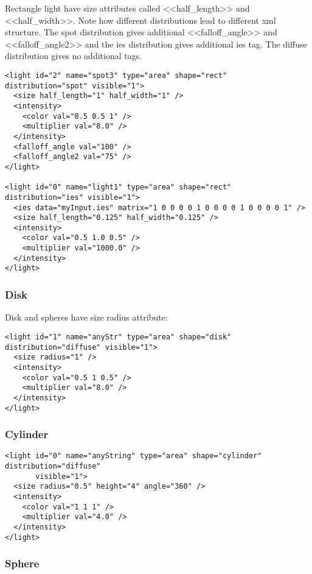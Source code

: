 \documentclass[a4paper,11pt]{report}
\begin{document}
Rectangle light have size attributes called <<half\_length>> and <<half\_width>>. Note how different distributions lead to different xml structure. The spot distribution gives additional <<falloff\_angle>> and <<falloff\_angle2>> and the ies distribution gives additional ies tag. The diffuse distribution gives no additional tags. 

\lstset{language=XML}
\begin{lstlisting}
<light id="2" name="spot3" type="area" shape="rect" distribution="spot" visible="1">
  <size half_length="1" half_width="1" />
  <intensity>
    <color val="0.5 0.5 1" />
    <multiplier val="8.0" />
  </intensity>
  <falloff_angle val="100" />
  <falloff_angle2 val="75" />
</light>

<light id="0" name="light1" type="area" shape="rect" distribution="ies" visible="1">
  <ies data="myInput.ies" matrix="1 0 0 0 0 1 0 0 0 0 1 0 0 0 0 1" />  
  <size half_length="0.125" half_width="0.125" />
  <intensity>
    <color val="0.5 1.0 0.5" />
    <multiplier val="1000.0" />
  </intensity>
</light>
\end{lstlisting}

\subsubsection{Disk}

Disk and spheres have size radius attribute:

\lstset{language=XML}
\begin{lstlisting}
<light id="1" name="anyStr" type="area" shape="disk" distribution="diffuse" visible="1">
  <size radius="1" />
  <intensity>
    <color val="0.5 1 0.5" />
    <multiplier val="8.0" />
  </intensity>
</light>
\end{lstlisting}

\subsubsection{Cylinder}

\lstset{language=XML}
\begin{lstlisting}
<light id="0" name="anyString" type="area" shape="cylinder" distribution="diffuse" 
       visible="1">
  <size radius="0.5" height="4" angle="360" />
  <intensity>
    <color val="1 1 1" />
    <multiplier val="4.0" />
  </intensity>
</light>
\end{lstlisting}

\subsubsection{Sphere}
\end{document}
